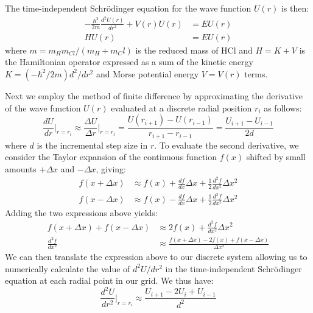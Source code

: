 \documentclass[%
aps, %
prl, %
preprint, %
12pt, %
amsfonts, %
amssymb, %
amsmath, %
endfloats,%
raggedbottom, %
]{revtex4-1}
\begin{document}
The time-independent Schrödinger equation for the wave function $U(r)$
is then:
\begin{align}
    -\frac{\hbar^2}{2m}\frac{d^2U(r)}{dr^2} + V(r)U(r) &= EU(r) \label{TISE}\\
    HU(r) &= EU(r)
\end{align}
where $m = m_Hm_{Cl}/(m_H + m_Cl)$ is the reduced mass of HCl and $H = K + V$ is the Hamiltonian operator expressed as a sum of the kinetic energy $K = (-\hbar^2/2m)d^2/dr^2$
and Morse potential energy $V = V(r)$ terms.

Next we employ the method of finite difference by approximating the derivative of the wave
function $U(r)$ evaluated at a discrete radial position $r_i$ as follows:
\begin{equation}
    \frac{dU}{dr}\Bigr|_{r=r_i} \approx \frac{\Delta U}{\Delta r}\Bigr|_{r=r_i} = \frac{U(r_{i+1}) - U(r_{i-1})}{r_{i+1} - r_{i-1}} = \frac{U_{i+1} - U_{i-1}}{2d}
\end{equation}
where $d$ is the incremental step size in $r$. To evaluate the second derivative, we consider
the Taylor expansion of the continuous function $f(x)$ shifted by small amounts $+\Delta x$ and $-\Delta x$, giving:
\begin{align}
    f(x + \Delta x) & \approx f(x) + \frac{df}{dx}\Delta x + \frac{1}{2}\frac{d^2f}{dx^2}\Delta x^2 \\
    f(x - \Delta x) & \approx f(x) - \frac{df}{dx}\Delta x + \frac{1}{2}\frac{d^2f}{dx^2}\Delta x^2
\end{align}
Adding the two expressions above yields:
\begin{align}
    f(x + \Delta x) + f(x - \Delta x) & \approx 2f(x) + \frac{d^2f}{dx^2}\Delta x^2 \\
    \frac{d^2f}{dx^2} & \approx \frac{f(x + \Delta x) - 2f(x) + f(x - \Delta x)}{\Delta x^2}
\end{align}
We can then translate the expression above to our discrete system allowing us to numerically
calculate the value of $d^2U/dr^2$ in the time-independent Schrödinger equation at each radial
point in our grid. We thus have:
\begin{equation} \label{finite-diff}
    \frac{d^2U}{dr^2}\Bigr|_{r=r_i} \approx \frac{U_{i+1} - 2U_i + U_{i-1}}{d^2}
\end{equation}
\end{document}
